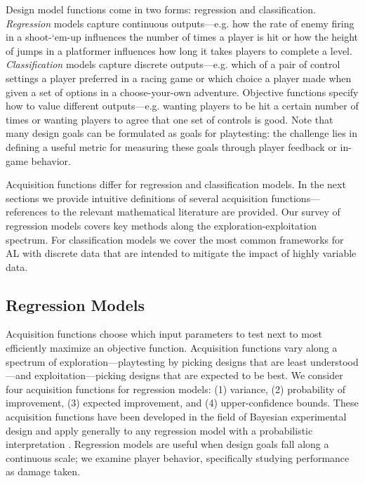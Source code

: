 \documentclass{sig-alternate}
\begin{document}
Design model functions come in two forms: regression and classification.
\textit{Regression} models capture continuous outputs---e.g. how the rate of enemy firing in a shoot-`em-up influences the number of times a player is hit or how the height of jumps in a platformer influences how long it takes players to complete a level.
\textit{Classification} models capture discrete outputs---e.g. which of a pair of control settings a player preferred in a racing game or which choice a player made when given a set of options in a choose-your-own adventure.
Objective functions specify how to value different outputs---e.g. wanting players to be hit a certain number of times or wanting players to agree that one set of controls is good.
Note that many design goals can be formulated as goals for playtesting: the challenge lies in defining a useful metric for measuring these goals through player feedback or in-game behavior.

Acquisition functions differ for regression and classification models.
In the next sections we provide intuitive definitions of several acquisition functions---references to the relevant mathematical literature are provided.
Our survey of regression models covers key methods along the exploration-exploitation spectrum.
For classification models we cover the most common frameworks for AL with discrete data that are intended to mitigate the impact of highly variable data.



\subsection{Regression Models}
Acquisition functions choose which input parameters to test next to most efficiently maximize an objective function.
Acquisition functions vary along a spectrum of exploration---playtesting by picking designs that are least understood---and exploitation---picking designs that are expected to be best.
We consider four acquisition functions for regression models: (1) variance, (2) probability of improvement, (3) expected improvement, and (4) upper-confidence bounds.
These acquisition functions have been developed in the field of Bayesian experimental design and apply generally to any regression model with a probabilistic interpretation \cite{chaloner1995, brochu2010:thesis}.
Regression models are useful when design goals fall along a continuous scale; we examine player behavior, specifically studying performance as damage taken.
\end{document}
